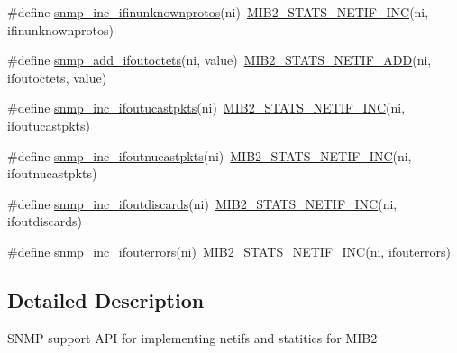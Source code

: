 \begin{DoxyCompactItemize}
\#define \hyperlink{openmote-cc2538_2lwip_2src_2include_2lwip_2snmp_8h_a63ef2fefce2eb758433b5169afba153b}{snmp\+\_\+inc\+\_\+ifinunknownprotos}(ni)~\hyperlink{openmote-cc2538_2lwip_2src_2include_2lwip_2snmp_8h_a3c52caf566d37705c6547f2d025afd9f}{M\+I\+B2\+\_\+\+S\+T\+A\+T\+S\+\_\+\+N\+E\+T\+I\+F\+\_\+\+I\+NC}(ni, ifinunknownprotos)
\item 
\#define \hyperlink{openmote-cc2538_2lwip_2src_2include_2lwip_2snmp_8h_ae23888101dd60de110eeb12d1bb77469}{snmp\+\_\+add\+\_\+ifoutoctets}(ni,  value)~\hyperlink{openmote-cc2538_2lwip_2src_2include_2lwip_2snmp_8h_a05641438775014b7e13b9e55eba48bed}{M\+I\+B2\+\_\+\+S\+T\+A\+T\+S\+\_\+\+N\+E\+T\+I\+F\+\_\+\+A\+DD}(ni, ifoutoctets, value)
\item 
\#define \hyperlink{openmote-cc2538_2lwip_2src_2include_2lwip_2snmp_8h_a329f57e22383f787c0520e00b45545c3}{snmp\+\_\+inc\+\_\+ifoutucastpkts}(ni)~\hyperlink{openmote-cc2538_2lwip_2src_2include_2lwip_2snmp_8h_a3c52caf566d37705c6547f2d025afd9f}{M\+I\+B2\+\_\+\+S\+T\+A\+T\+S\+\_\+\+N\+E\+T\+I\+F\+\_\+\+I\+NC}(ni, ifoutucastpkts)
\item 
\#define \hyperlink{openmote-cc2538_2lwip_2src_2include_2lwip_2snmp_8h_aacfcb7039409c47eb5e0deb064c48eb8}{snmp\+\_\+inc\+\_\+ifoutnucastpkts}(ni)~\hyperlink{openmote-cc2538_2lwip_2src_2include_2lwip_2snmp_8h_a3c52caf566d37705c6547f2d025afd9f}{M\+I\+B2\+\_\+\+S\+T\+A\+T\+S\+\_\+\+N\+E\+T\+I\+F\+\_\+\+I\+NC}(ni, ifoutnucastpkts)
\item 
\#define \hyperlink{openmote-cc2538_2lwip_2src_2include_2lwip_2snmp_8h_afcef081cefc8176be9329ff4a6bd4249}{snmp\+\_\+inc\+\_\+ifoutdiscards}(ni)~\hyperlink{openmote-cc2538_2lwip_2src_2include_2lwip_2snmp_8h_a3c52caf566d37705c6547f2d025afd9f}{M\+I\+B2\+\_\+\+S\+T\+A\+T\+S\+\_\+\+N\+E\+T\+I\+F\+\_\+\+I\+NC}(ni, ifoutdiscards)
\item 
\#define \hyperlink{openmote-cc2538_2lwip_2src_2include_2lwip_2snmp_8h_a69d756ae146dfbe0aa04667ba4d63e20}{snmp\+\_\+inc\+\_\+ifouterrors}(ni)~\hyperlink{openmote-cc2538_2lwip_2src_2include_2lwip_2snmp_8h_a3c52caf566d37705c6547f2d025afd9f}{M\+I\+B2\+\_\+\+S\+T\+A\+T\+S\+\_\+\+N\+E\+T\+I\+F\+\_\+\+I\+NC}(ni, ifouterrors)
\end{DoxyCompactItemize}


\subsection{Detailed Description}
S\+N\+MP support A\+PI for implementing netifs and statitics for M\+I\+B2 

